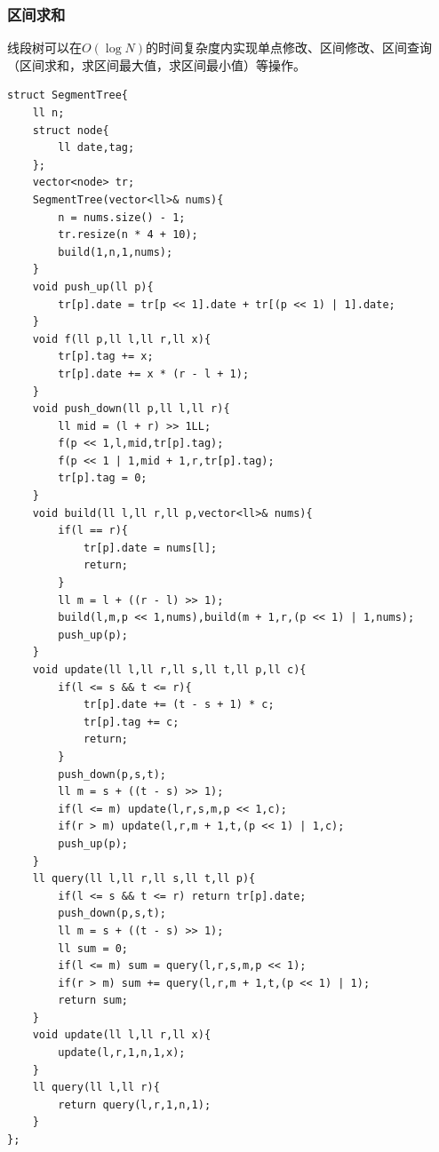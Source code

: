 \subsubsection{区间求和}
线段树可以在$O(\log N)$的时间复杂度内实现单点修改、区间修改、区间查询（区间求和，求区间最大值，求区间最小值）等操作。
\begin{lstlisting}[caption={}]
struct SegmentTree{
    ll n;
    struct node{
        ll date,tag;
    };
    vector<node> tr;
    SegmentTree(vector<ll>& nums){
        n = nums.size() - 1;
        tr.resize(n * 4 + 10);
        build(1,n,1,nums);
    }
    void push_up(ll p){
        tr[p].date = tr[p << 1].date + tr[(p << 1) | 1].date;
    }
    void f(ll p,ll l,ll r,ll x){
        tr[p].tag += x;
        tr[p].date += x * (r - l + 1);
    }
    void push_down(ll p,ll l,ll r){
        ll mid = (l + r) >> 1LL;
        f(p << 1,l,mid,tr[p].tag);
        f(p << 1 | 1,mid + 1,r,tr[p].tag);
        tr[p].tag = 0;
    }
    void build(ll l,ll r,ll p,vector<ll>& nums){
        if(l == r){
            tr[p].date = nums[l];
            return;
        }
        ll m = l + ((r - l) >> 1);
        build(l,m,p << 1,nums),build(m + 1,r,(p << 1) | 1,nums);
        push_up(p);
    }
    void update(ll l,ll r,ll s,ll t,ll p,ll c){
        if(l <= s && t <= r){
            tr[p].date += (t - s + 1) * c;
            tr[p].tag += c;
            return;
        }
        push_down(p,s,t);
        ll m = s + ((t - s) >> 1);
        if(l <= m) update(l,r,s,m,p << 1,c);
        if(r > m) update(l,r,m + 1,t,(p << 1) | 1,c);
        push_up(p);
    }
    ll query(ll l,ll r,ll s,ll t,ll p){
        if(l <= s && t <= r) return tr[p].date;
        push_down(p,s,t);
        ll m = s + ((t - s) >> 1);
        ll sum = 0;
        if(l <= m) sum = query(l,r,s,m,p << 1);
        if(r > m) sum += query(l,r,m + 1,t,(p << 1) | 1);
        return sum;
    }
    void update(ll l,ll r,ll x){
        update(l,r,1,n,1,x);
    }
    ll query(ll l,ll r){
        return query(l,r,1,n,1);
    }
};
\end{lstlisting}


